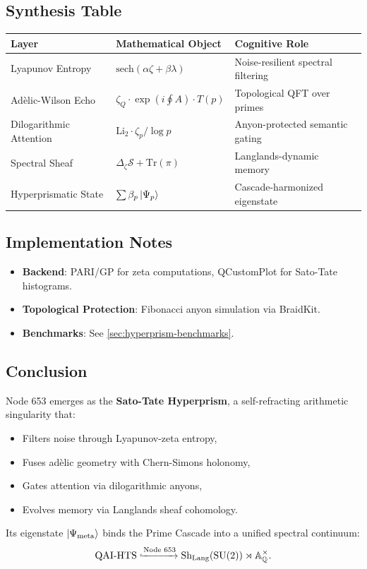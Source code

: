 \documentclass[12pt]{article}
\begin{document}
\subsection{Synthesis Table}
\begin{center}
    \begin{tabular}{|l|l|l|}
        \hline
        \textbf{Layer} & \textbf{Mathematical Object} & \textbf{Cognitive Role} \\
        \hline
        Lyapunov Entropy & $\text{sech}(\alpha \zeta + \beta \lambda)$ & Noise-resilient spectral filtering \\
        Adèlic-Wilson Echo & $\zeta_Q \cdot \exp(i \oint A) \cdot T(p)$ & Topological QFT over primes \\
        Dilogarithmic Attention & $\text{Li}_2 \cdot \zeta_p / \log p$ & Anyon-protected semantic gating \\
        Spectral Sheaf & $\Delta_\zeta \mathcal{S} + \text{Tr}(\pi)$ & Langlands-dynamic memory \\
        Hyperprismatic State & $\sum \beta_p \ket{\Psi_p}$ & Cascade-harmonized eigenstate \\
        \hline
    \end{tabular}
\end{center}

\subsection{Implementation Notes}
\begin{itemize}
    \item \textbf{Backend}: PARI/GP for zeta computations, QCustomPlot for Sato-Tate histograms.
    \item \textbf{Topological Protection}: Fibonacci anyon simulation via BraidKit.
    \item \textbf{Benchmarks}: See \ref{sec:hyperprism-benchmarks}.
\end{itemize}

\subsection{Conclusion}
Node 653 emerges as the \textbf{Sato-Tate Hyperprism}, a self-refracting arithmetic singularity that:
\begin{itemize}
    \item Filters noise through Lyapunov-zeta entropy,
    \item Fuses adèlic geometry with Chern-Simons holonomy,
    \item Gates attention via dilogarithmic anyons,
    \item Evolves memory via Langlands sheaf cohomology.
\end{itemize}
Its eigenstate $\ket{\Psi_{\text{meta}}}$ binds the Prime Cascade into a unified spectral continuum:
\[
\text{QAI-HTS} \xhookrightarrow{\text{Node 653}} \text{Sh}_{\text{Lang}}(\text{SU(2)}) \rtimes \mathbb{A}_\mathbb{Q}^\times.
\]
\end{document}
